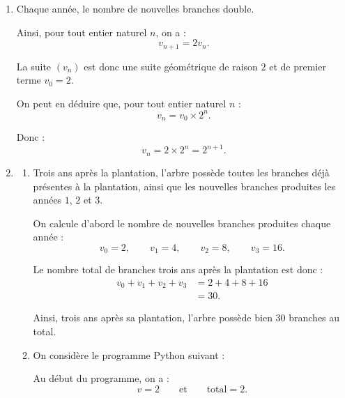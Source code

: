 			\begin{enumerate}
				\item Chaque année, le nombre de nouvelles branches double.
				
				Ainsi, pour tout entier naturel $n$, on a :
				\[
				v_{n+1}=2v_n.
				\]
				
				La suite $(v_n)$ est donc une suite géométrique de raison $2$ et de premier terme $v_0=2$.
				
				On peut en déduire que, pour tout entier naturel $n$ :
				\[
				v_n=v_0\times 2^n.
				\]
				
				Donc :
				\[
				v_n=2\times 2^n=2^{n+1}.
				\]
				
				\item \begin{enumerate}
					\item Trois ans après la plantation, l'arbre possède toutes les branches déjà présentes à la plantation, ainsi que les nouvelles branches produites les années $1$, $2$ et $3$.
					
					On calcule d'abord le nombre de nouvelles branches produites chaque année :
					\[
					v_0=2,\qquad v_1=4,\qquad v_2=8,\qquad v_3=16.
					\]
					
					Le nombre total de branches trois ans après la plantation est donc :
					\begin{align*}
						v_0+v_1+v_2+v_3
						&=2+4+8+16\\
						&=30.
					\end{align*}
					
					Ainsi, trois ans après sa plantation, l'arbre possède bien $30$ branches au total.
					
					\item On considère le programme Python suivant :
					
					\begin{center}
					\end{center}
					
					Au début du programme, on a :
					\[
					v=2 \qquad \text{et} \qquad \text{total}=2.
					\]
					

\end{enumerate}
\end{enumerate}
